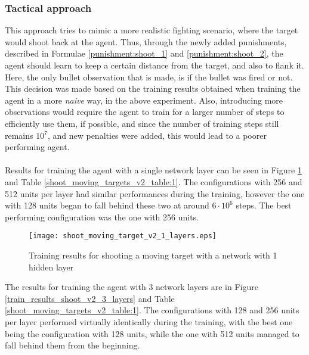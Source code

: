 \subsubsection{Tactical approach} \label{subsubsection:shoot_tactical}

This approach tries to mimic a more realistic fighting scenario, where the target would shoot back at the agent. Thus, through the newly added punishments, described in Formulae \ref{punishment:shoot_1} and \ref{punishment:shoot_2}, the agent should learn to keep a certain distance from the target, and also to flank it. Here, the only bullet observation that is made, is if the bullet was fired or not. This decision was made based on the training results obtained when training the agent in a more \emph{naive} way, in the above experiment. Also, introducing more observations would require the agent to train for a larger number of steps to efficiently use them, if possible, and since the number of training steps still remains $10^7$, and new penalties were added, this would lead to a poorer performing agent. 

\paragraph{}
Results for training the agent with a single network layer can be seen in Figure \ref{train_results_shoot_v2_1_layers} and Table \ref{shoot_moving_targets_v2_table:1}. The configurations with 256 and 512 units per layer had similar performances during the training, however the one with 128 units began to fall behind these two at around $6 \cdot 10^6$ steps. The best performing configuration was the one with 256 units.

\begin{figure}
    \begin{center}
        \texttt{[image: shoot\_moving\_target\_v2\_1\_layers.eps]}
        \caption{Training results for shooting a moving target with a network with 1 hidden layer}
        \label{train_results_shoot_v2_1_layers}
    \end{center}
\end{figure}

The results for training the agent with 3 network layers are in Figure \ref{train_results_shoot_v2_3_layers} and Table \ref{shoot_moving_targets_v2_table:1}. The configurations with 128 and 256 units per layer performed virtually identically during the training, with the best one being the configuration with 128 units, while the one with 512 units managed to fall behind them from the beginning.

